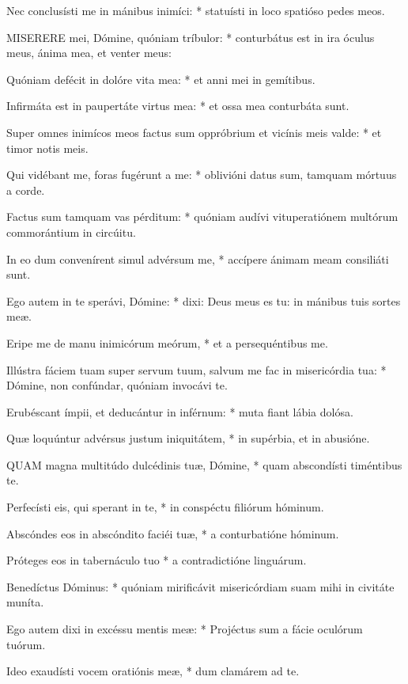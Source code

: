 Nec conclusísti me in mánibus inimíci: * statuísti in loco spatióso pedes meos.


\lettrine[lines=2]{M}{ISERERE} mei, Dómine, quóniam tríbulor: * conturbátus est in ira óculus meus, ánima mea, et venter meus:

Quóniam defécit in dolóre vita mea: * et anni mei in gemítibus.

Infirmáta est in paupertáte virtus mea: * et ossa mea conturbáta sunt.

Super omnes inimícos meos factus sum oppróbrium et vicínis meis valde: * et timor notis meis.

Qui vidébant me, foras fugérunt a me: * oblivióni datus sum, tamquam mórtuus a corde.

Factus sum tamquam vas pérditum: * quóniam audívi vituperatiónem multórum commorántium in circúitu.

In eo dum convenírent simul advérsum me, * accípere ánimam meam consiliáti sunt.

Ego autem in te sperávi, Dómine: * dixi: Deus meus es tu: in mánibus tuis sortes meæ.

Eripe me de manu inimicórum meórum, * et a persequéntibus me.

Illústra fáciem tuam super servum tuum, salvum me fac in misericórdia tua: * Dómine, non confúndar, quóniam invocávi te.

Erubéscant ímpii, et deducántur in inférnum: * muta fiant lábia dolósa.

Quæ loquúntur advérsus justum iniquitátem, * in supérbia, et in abusióne.


\lettrine[lines=2]{Q}{UAM} magna multitúdo dulcédinis tuæ, Dómine, * quam abscondísti timéntibus te.

Perfecísti eis, qui sperant in te, * in conspéctu filiórum hóminum.

Abscóndes eos in abscóndito faciéi tuæ, * a conturbatióne hóminum.

Próteges eos in tabernáculo tuo * a contradictióne linguárum.

Benedíctus Dóminus: * quóniam mirificávit misericórdiam suam mihi in civitáte muníta.

Ego autem dixi in excéssu mentis meæ: * Projéctus sum a fácie oculórum tuórum.

Ideo exaudísti vocem oratiónis meæ, * dum clamárem ad te.


